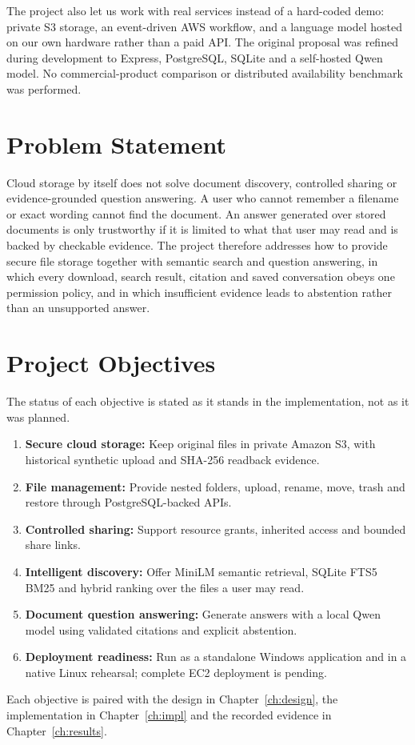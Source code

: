 The project also let us work with real services instead of a hard-coded demo: private S3 storage, an event-driven AWS workflow, and a language model hosted on our own hardware rather than a paid API. The original proposal was refined during development to Express, PostgreSQL, SQLite and a self-hosted Qwen model. No commercial-product comparison or distributed availability benchmark was performed.

\section{Problem Statement}

Cloud storage by itself does not solve document discovery, controlled sharing or evidence-grounded question answering. A user who cannot remember a filename or exact wording cannot find the document. An answer generated over stored documents is only trustworthy if it is limited to what that user may read and is backed by checkable evidence. The project therefore addresses how to provide secure file storage together with semantic search and question answering, in which every download, search result, citation and saved conversation obeys one permission policy, and in which insufficient evidence leads to abstention rather than an unsupported answer.

\section{Project Objectives}
\label{sec:objectives}

The status of each objective is stated as it stands in the implementation, not as it was planned.

\begin{enumerate}
  \item \textbf{Secure cloud storage:} Keep original files in private Amazon S3, with historical synthetic upload and SHA-256 readback evidence.
  \item \textbf{File management:} Provide nested folders, upload, rename, move, trash and restore through PostgreSQL-backed APIs.
  \item \textbf{Controlled sharing:} Support resource grants, inherited access and bounded share links.
  \item \textbf{Intelligent discovery:} Offer MiniLM semantic retrieval, SQLite FTS5 BM25 and hybrid ranking over the files a user may read.
  \item \textbf{Document question answering:} Generate answers with a local Qwen model using validated citations and explicit abstention.
  \item \textbf{Deployment readiness:} Run as a standalone Windows application and in a native Linux rehearsal; complete EC2 deployment is pending.
\end{enumerate}

Each objective is paired with the design in Chapter~\ref{ch:design}, the implementation in Chapter~\ref{ch:impl} and the recorded evidence in Chapter~\ref{ch:results}.
